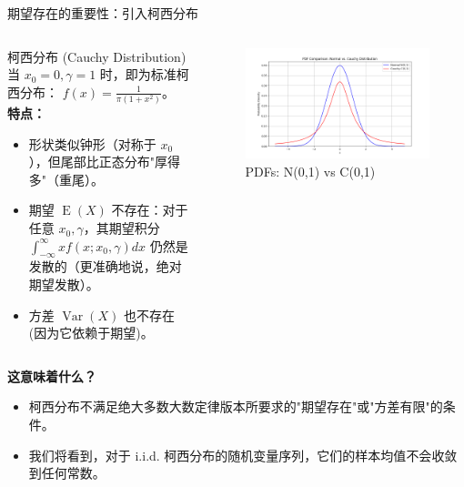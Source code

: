 \documentclass[UTF8]{beamer}
\DeclareMathOperator{\E}{\operatorname{E}}
\DeclareMathOperator{\Var}{\operatorname{Var}}
\begin{document}
\begin{frame}[shrink=10]{期望存在的重要性：引入柯西分布}
\begin{columns}[T]
\begin{column}{0.55\textwidth}
\begin{block}{柯西分布 (Cauchy Distribution)}
                当 $x_0=0, \gamma=1$ 时，即为标准柯西分布： $f(x) = \frac{1}{\pi (1+x^2)}$。
                \textbf{特点：}
                \begin{itemize}
                    \item 形状类似钟形（对称于 $x_0$），但尾部比正态分布"厚得多"（重尾）。
                    \item \alert{期望 $\E(X)$ 不存在}：对于任意 $x_0, \gamma$，其期望积分 $\int_{-\infty}^{\infty} x f(x; x_0, \gamma) dx$ 仍然是发散的（更准确地说，绝对期望发散）。
                    \item \alert{方差 $\Var(X)$ 也不存在} (因为它依赖于期望)。
                \end{itemize}
            \end{block}
        \end{column}
        \begin{column}{0.4\textwidth}
            \begin{figure}
                \centering
                \includegraphics[width=\linewidth]{pdf_normal_cauchy_comparison.png} %
                \caption*{PDFs: N(0,1) vs C(0,1)} %
            \end{figure}
        \end{column}
    \end{columns}
    \pause %
    \textbf{这意味着什么？}
    \begin{itemize}
        \item 柯西分布不满足绝大多数大数定律版本所要求的"期望存在"或"方差有限"的条件。
        \item 我们将看到，对于 i.i.d. 柯西分布的随机变量序列，它们的样本均值\alert{不会}收敛到任何常数。
    \end{itemize}
\end{frame}
\end{document}
